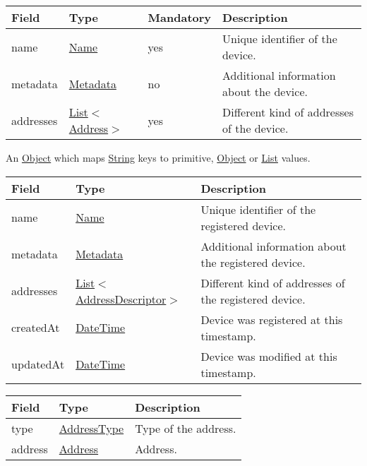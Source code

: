 \documentclass[a4paper]{arrowhead}
\newcommand{\pref}[1]{{\textcolor{ArrowheadGrey}{\hyperref[sec:model:primitives:#1]{#1}}}}
\begin{document}
\begin{table}[ht!]
\begin{tabularx}{\textwidth}{| p{3cm} | p{3cm} | p{2cm} | X |} \hline
\rowcolor{gray!33} Field & Type & Mandatory & Description \\ \hline
name & \pref{Name} & yes & Unique identifier of the device. \\ \hline
metadata &\hyperref[sec:model:Metadata]{Metadata} & no & Additional information about the device. \\ \hline
addresses &  \pref{List}$<$\pref{Address}$>$ & yes & Different kind of addresses of the device.  \\ \hline
\end{tabularx}
\end{table}


An \pref{Object} which maps \pref{String} keys to primitive, \pref{Object} or \pref{List} values.

 
\begin{table}[ht!]
\begin{tabularx}{\textwidth}{| p{4.25cm} | p{4cm} | X |} \hline
\rowcolor{gray!33} Field & Type      & Description \\ \hline
name & \pref{Name} & Unique identifier of the registered device. \\ \hline
metadata & \hyperref[sec:model:Metadata]{Metadata} & Additional information about the registered device. \\ \hline
addresses &  \pref{List}$<$\hyperref[sec:model:AddressDescriptor]{AddressDescriptor}$>$ & Different kind of addresses of the registered device.  \\ \hline
createdAt & \pref{DateTime} & Device was registered at this timestamp. \\ \hline
updatedAt & \pref{DateTime} & Device was modified at this timestamp. \\ \hline
\end{tabularx}
\end{table}

\clearpage


\begin{table}[ht!]
\begin{tabularx}{\textwidth}{| p{4.25cm} | p{3.5cm} | X |} \hline
\rowcolor{gray!33} Field & Type      & Description \\ \hline
type & \pref{AddressType} & Type of the address. \\ \hline
address & \pref{Address} & Address. \\ \hline
\end{tabularx}
\end{table}
\end{document}
